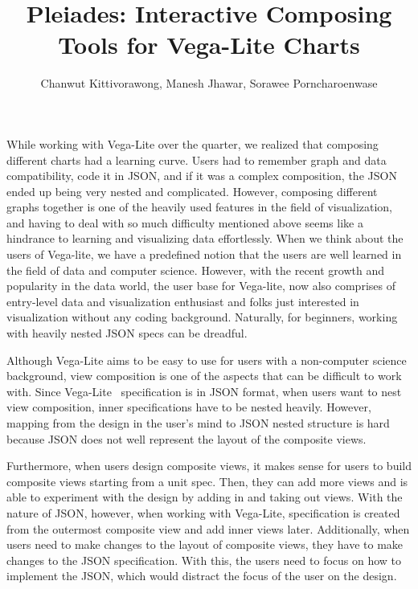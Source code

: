 \documentclass[journal]{vgtc}                %
\title{Pleiades: Interactive Composing Tools for Vega-Lite Charts}
\author{Chanwut Kittivorawong, Manesh Jhawar, Sorawee Porncharoenwase}
\begin{document}


\maketitle

While working with Vega-Lite over the quarter, we realized that composing
different charts had a learning curve. Users had to remember graph and data
compatibility, code it in JSON, and if it was a complex composition, the JSON
ended up being very nested and complicated. However, composing different graphs
together is one of the heavily used features in the field of visualization, and
having to deal with so much difficulty mentioned above seems like a hindrance to
learning and visualizing data effortlessly. When we think about the users of
Vega-lite, we have a predefined notion that the users are well learned in the
field of data and computer science. However, with the recent growth and popularity
in the data world, the user base for Vega-lite, now also comprises of entry-level
data and visualization enthusiast and folks just interested in visualization without
any coding background. Naturally, for beginners, working with heavily nested JSON
specs can be dreadful. 

Although Vega-Lite aims to be easy to use for users with a non-computer science
background, view composition is one of the aspects that can be difficult to work
with. Since Vega-Lite~\cite{notes2002} specification is in JSON format, when users
want to nest view composition, inner specifications have to be nested heavily.
However, mapping from the design in the user’s mind to JSON nested structure is
hard because JSON does not well represent the layout of the composite views.

Furthermore, when users design composite views, it makes sense for users to build
composite views starting from a unit spec. Then, they can add more views and is
able to experiment with the design by adding in and taking out views. With the
nature of JSON, however, when working with Vega-Lite, specification is created
from the outermost composite view and add inner views later. Additionally, when
users need to make changes to the layout of composite views, they have to make
changes to the JSON specification. With this, the users need to focus on how to
implement the JSON, which would distract the focus of the user on the design.
\end{document}
